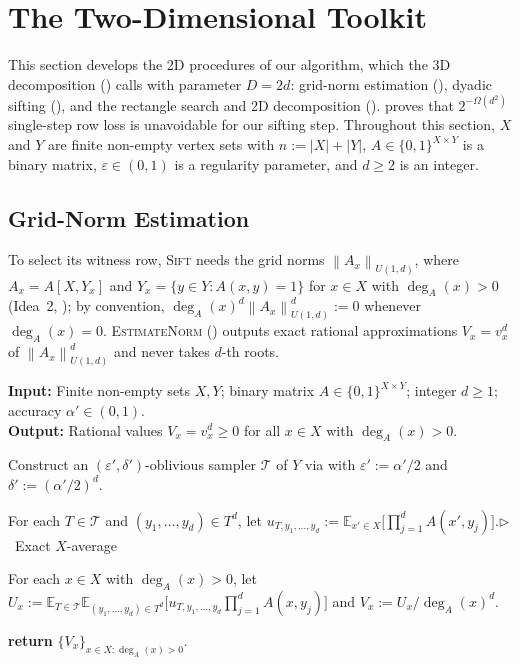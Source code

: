 \documentclass[11pt]{article}
\theoremstyle{definition}
\newcommand{\algcomment}[1]{\hfill $\triangleright$~{\small #1}}
\renewcommand{\label}[1]{}%
\newcommand{\E}{\mathbb{E}}
\newcommand{\norm}[1]{\left\lVert #1 \right\rVert}
\newcommand{\abs}[1]{\left\lvert #1 \right\rvert}
\newcommand{\EstimateNorm}{\textnormal{\textsc{EstimateNorm}}}
\newcommand{\Sift}{\textnormal{\textsc{Sift}}}
\begin{document}
\section{The Two-Dimensional Toolkit}
\label{sec:2d}

This section develops the 2D procedures of our algorithm, which the 3D decomposition () calls with parameter $D = 2d$: grid-norm estimation (), dyadic sifting (), and the rectangle search and 2D decomposition ().  proves that $2^{-\Omega(d^2)}$ single-step row loss is unavoidable for our sifting step. Throughout this section, $X$ and $Y$ are finite non-empty vertex sets with $n := \abs{X} + \abs{Y}$, $A \in \{0, 1\}^{X \times Y}$ is a binary matrix, $\varepsilon \in (0, 1)$ is a regularity parameter, and $d \ge 2$ is an integer.

\subsection{Grid-Norm Estimation}
\label{sec:2d-norm}

To select its witness row, \Sift{} needs the grid norms $\norm{A_x}_{U(1, d)}$, where $A_x = A[X, Y_x]$ and $Y_x = \{y \in Y : A(x, y) = 1\}$ for $x \in X$ with $\deg_A(x) > 0$ (Idea~2, ); by convention, $\deg_A(x)^d \norm{A_x}_{U(1, d)}^d := 0$ whenever $\deg_A(x) = 0$. \EstimateNorm{} () outputs exact rational approximations $V_x = v_x^d$ of $\norm{A_x}_{U(1, d)}^d$ and never takes $d$-th roots.

\begin{algorithm}[t]
\caption{$\EstimateNorm(X, Y, A, d, \alpha')$}\label{alg:estimate-norm}
\textbf{Input:} Finite non-empty sets $X, Y$; binary matrix $A \in \{0, 1\}^{X \times Y}$; integer $d \ge 1$; accuracy $\alpha' \in (0, 1)$.\\
\textbf{Output:} Rational values $V_x = v_x^d \ge 0$ for all $x \in X$ with $\deg_A(x) > 0$.
\begin{algsteps}
    \item Construct an $(\varepsilon', \delta')$-oblivious sampler $\mathcal{T}$ of $Y$ via  with $\varepsilon' := \alpha' / 2$ and $\delta' := (\alpha' / 2)^d$.\label{line:est-sampler}
    \item For each $T \in \mathcal{T}$ and $(y_1, \dots, y_d) \in T^d$, let $u_{T, y_1, \dots, y_d} := \E_{x' \in X}\big[\prod_{j=1}^d A(x', y_j)\big]$.\algcomment{Exact $X$-average}\label{line:est-u}
    \item For each $x \in X$ with $\deg_A(x) > 0$, let $U_x := \E_{T \in \mathcal{T}}\E_{(y_1, \dots, y_d) \in T^d}\big[u_{T, y_1, \dots, y_d}\prod_{j=1}^d A(x, y_j)\big]$ and $V_x := U_x / \deg_A(x)^d$.\label{line:est-v}
    \item \textbf{return} $\{V_x\}_{x \in X : \deg_A(x) > 0}$.\label{line:est-ret}
\end{algsteps}
\end{algorithm}
\end{document}

